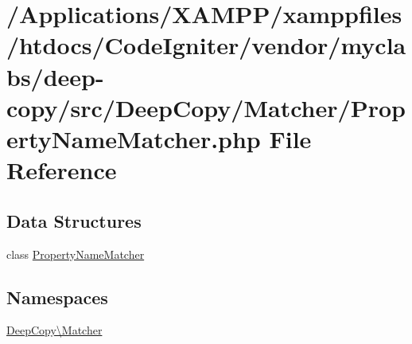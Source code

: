 \hypertarget{_property_name_matcher_8php}{}\section{/\+Applications/\+X\+A\+M\+P\+P/xamppfiles/htdocs/\+Code\+Igniter/vendor/myclabs/deep-\/copy/src/\+Deep\+Copy/\+Matcher/\+Property\+Name\+Matcher.php File Reference}
\label{_property_name_matcher_8php}
\subsection*{Data Structures}
\begin{DoxyCompactItemize}
\item 
class \mbox{\hyperlink{class_deep_copy_1_1_matcher_1_1_property_name_matcher}{Property\+Name\+Matcher}}
\end{DoxyCompactItemize}
\subsection*{Namespaces}
\begin{DoxyCompactItemize}
\item 
 \mbox{\hyperlink{namespace_deep_copy_1_1_matcher}{Deep\+Copy\textbackslash{}\+Matcher}}
\end{DoxyCompactItemize}

